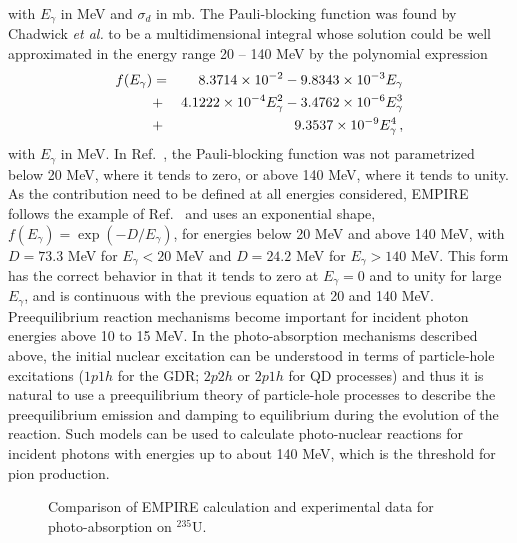 with $E_{\gamma}$ in MeV and $\sigma_{d}$ in mb. The Pauli-blocking function
was found by Chadwick \emph{et al.} to be a multidimensional integral whose
solution could be well approximated in the energy range 20 -- 140 MeV by the
polynomial expression
\begin{eqnarray}
f(E_{\gamma}) & = & \;8.3714\times10^{-2}-9.8343\times10^{-3}E_{\gamma}
\notag \\
&+&4.1222\times10^{-4}E_{\gamma}^{2} -3.4762\times10^{-6}E_{\gamma}^{3}
\notag \\
&+&9.3537\times10^{-9}E_{\gamma}^{4}\,,
\end{eqnarray}
with $E_{\gamma}$ in MeV. In Ref.~\cite{chadQD}, the Pauli-blocking function
was not parametrized below 20 MeV, where it tends to zero, or above 140 MeV,
where it tends to unity. As the contribution need to be defined at all
energies considered, EMPIRE follows the example of Ref.~\cite{PHNuc} and
uses an exponential shape, $f(E_{\gamma})=\exp(-D/E_{\gamma})$, for energies
below 20 MeV and above 140 MeV, with $D=73.3$ MeV for $E_{\gamma}<20$ MeV
and $D=24.2$ MeV for $E_{\gamma}>140$ MeV. This form has the correct
behavior in that it tends to zero at $E_{\gamma}=0$ and to unity for large $%
E_{\gamma}$, and is continuous with the previous equation at 20 and 140 MeV.
Preequilibrium reaction mechanisms become important for incident photon
energies above 10 to 15 MeV. In the photo-absorption mechanisms described
above, the initial nuclear excitation can be understood in terms of
particle-hole excitations ($1p1h$ for the GDR; $2p2h$ or $2p1h$ for QD
processes) and thus it is natural to use a preequilibrium theory of
particle-hole processes to describe the preequilibrium emission and damping
to equilibrium during the evolution of the reaction. Such models can be used
to calculate photo-nuclear reactions for incident photons with energies up
to about 140 MeV, which is the threshold for pion production.
\begin{figure}[htbp]
\caption{Comparison of EMPIRE calculation and experimental data for
photo-absorption on $^{235}$U.}
\label{u235abs}
\end{figure}

